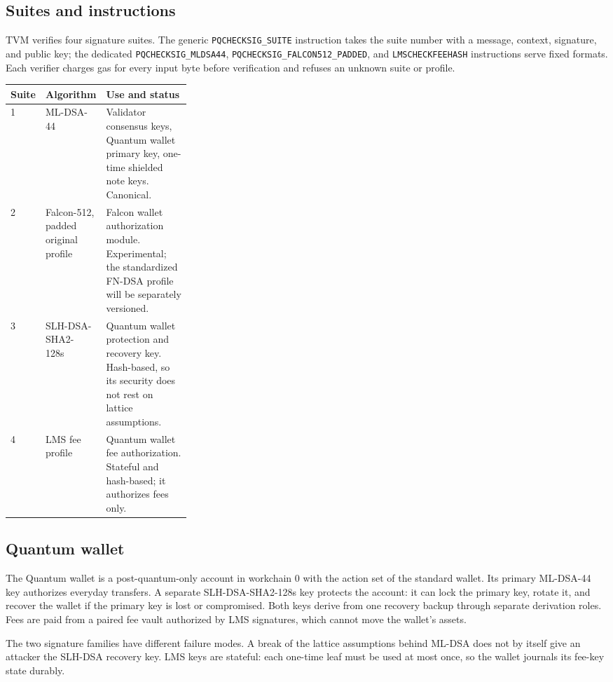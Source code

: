 \documentclass[11pt,a4paper]{article}
\newcommand{\code}[1]{\texttt{#1}}
\begin{document}
\subsection{Suites and instructions}
TVM verifies four signature suites. The generic \code{PQCHECKSIG\_SUITE}
instruction takes the suite number with a message, context, signature, and
public key; the dedicated \code{PQCHECKSIG\_MLDSA44},
\code{PQCHECKSIG\_FALCON512\_PADDED}, and \code{LMSCHECKFEEHASH} instructions
serve fixed formats. Each verifier charges gas for every input byte before
verification and refuses an unknown suite or profile.
\begin{center}
\small
\begin{tabularx}{\linewidth}{@{}p{0.06\linewidth}p{0.24\linewidth}X@{}}
\toprule
Suite & Algorithm & Use and status \\
\midrule
1 & ML-DSA-44~\cite{fips204} & Validator consensus keys, Quantum wallet primary key, one-time shielded note keys. Canonical. \\
2 & Falcon-512, padded original profile~\cite{falcon} & Falcon wallet authorization module. Experimental; the standardized FN-DSA profile will be separately versioned. \\
3 & SLH-DSA-SHA2-128s~\cite{fips205} & Quantum wallet protection and recovery key. Hash-based, so its security does not rest on lattice assumptions. \\
4 & LMS fee profile~\cite{sp800208} & Quantum wallet fee authorization. Stateful and hash-based; it authorizes fees only. \\
\bottomrule
\end{tabularx}
\end{center}

\subsection{Quantum wallet}
The Quantum wallet is a post-quantum-only account in workchain 0 with the
action set of the standard wallet. Its primary ML-DSA-44 key authorizes
everyday transfers. A separate SLH-DSA-SHA2-128s key protects the account:
it can lock the primary key, rotate it, and recover the wallet if the primary
key is lost or compromised. Both keys derive from one recovery backup through
separate derivation roles. Fees are paid from a paired fee vault authorized by
LMS signatures, which cannot move the wallet's assets.

The two signature families have different failure modes. A break of the
lattice assumptions behind ML-DSA does not by itself give an attacker the
SLH-DSA recovery key. LMS keys are stateful: each one-time leaf must be used
at most once, so the wallet journals its fee-key state durably.
\end{document}
